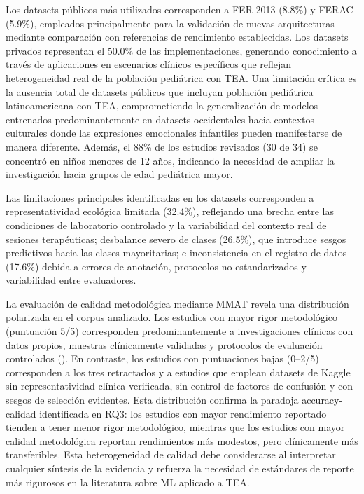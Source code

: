 \documentclass[ASNA,twocolumn]{USG}
\begin{document}
	Los datasets públicos más utilizados corresponden a FER-2013 (8.8\%) y FERAC
	(5.9\%), empleados principalmente para la validación de nuevas arquitecturas
	mediante comparación con referencias de rendimiento establecidas. Los datasets
	privados representan el 50.0\% de las implementaciones, generando conocimiento a
	través de aplicaciones en escenarios clínicos específicos que reflejan
	heterogeneidad real de la población pediátrica con TEA. Una limitación crítica es
	la ausencia total de datasets públicos que incluyan población pediátrica
	latinoamericana con TEA, comprometiendo la generalización de modelos entrenados
	predominantemente en datasets occidentales hacia contextos culturales donde las
	expresiones emocionales infantiles pueden manifestarse de manera diferente. Además,
	el 88\% de los estudios revisados (30 de 34) se concentró en niños menores de 12
	años, indicando la necesidad de ampliar la investigación hacia grupos de edad
	pediátrica mayor.
	
	Las limitaciones principales identificadas en los datasets corresponden a
	representatividad ecológica limitada (32.4\%), reflejando una brecha entre las
	condiciones de laboratorio controlado y la variabilidad del contexto real de
	sesiones terapéuticas; desbalance severo de clases (26.5\%), que introduce sesgos
	predictivos hacia las clases mayoritarias; e inconsistencia en el registro de datos
	(17.6\%) debida a errores de anotación, protocolos no estandarizados y variabilidad
	entre evaluadores.
	
	La evaluación de calidad metodológica mediante MMAT revela una distribución
	polarizada en el corpus analizado. Los estudios con mayor rigor metodológico
	(puntuación 5/5) corresponden predominantemente a investigaciones clínicas con
	datos propios, muestras clínicamente validadas y protocolos de evaluación
	controlados (\cite{He2019,Reed2021,Radocaj2025,Washington2022,Sariyanidi2025,Hassan2025,Rudovic2018,Rudovic2019,Hwang2024,Papaioannou2021,Dapogny2019,Leo2018,Xu2023,OSullivan2023}).
	En contraste, los estudios con puntuaciones bajas (0--2/5) corresponden a los tres
	retractados y a estudios que emplean datasets de Kaggle sin representatividad
	clínica verificada, sin control de factores de confusión y con sesgos de selección
	evidentes. Esta distribución confirma la paradoja accuracy-calidad identificada en
	RQ3: los estudios con mayor rendimiento reportado tienden a tener menor rigor
	metodológico, mientras que los estudios con mayor calidad metodológica reportan
	rendimientos más modestos, pero clínicamente más transferibles. Esta heterogeneidad
	de calidad debe considerarse al interpretar cualquier síntesis de la evidencia y
	refuerza la necesidad de estándares de reporte más rigurosos en la literatura sobre
	ML aplicado a TEA.
	
\end{document}
